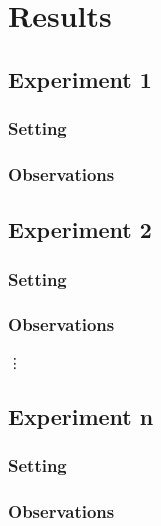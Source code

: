 \documentclass[11pt]{article}
\begin{document}
\section{Results}

\subsection{Experiment 1}

\subsubsection{Setting}

\subsubsection{Observations}

\subsection{Experiment 2}

\subsubsection{Setting}

\subsubsection{Observations}

\vdots

\subsection{Experiment n}

\subsubsection{Setting}

\subsubsection{Observations}
\end{document}
